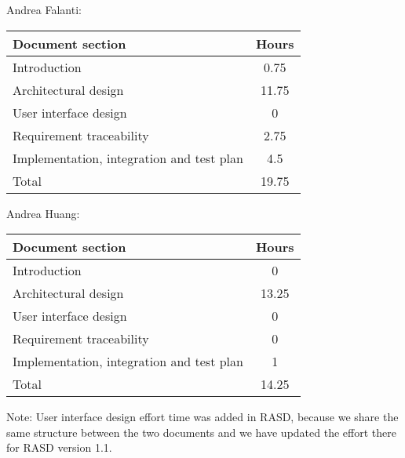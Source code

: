 Andrea Falanti:

\begin{tabular}{|l|c|}
    \hline
    Document section & Hours \\
    \hline
     Introduction & 0.75\\
     Architectural design & 11.75\\
     User interface design & 0\\
     Requirement traceability & 2.75\\
     Implementation, integration and test plan & 4.5\\
     \hline
     Total & 19.75\\
     \hline
\end{tabular}
\vskip 0.3in

Andrea Huang:

\begin{tabular}{|l|c|}
    \hline
    Document section & Hours \\
    \hline
     Introduction & 0\\
     Architectural design & 13.25\\
     User interface design & 0\\
     Requirement traceability & 0\\
     Implementation, integration and test plan & 1\\
     \hline
     Total & 14.25\\
     \hline
\end{tabular}

Note: User interface design effort time was added in RASD, because we share the same structure between the two documents and we have updated the effort there for RASD version 1.1. 